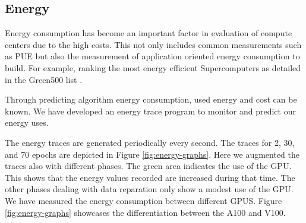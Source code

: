 \documentclass[utf8]{FrontiersinVancouver} %
\begin{document}
\subsection{Energy}
\label{sec:perf-energy}


Energy consumption has become an important factor in evaluation of
compute centers due to the high costs. This not only includes common 
measurements such as PUE but also the measurement of application 
oriented energy consumption to build. For example, ranking the most 
energy efficient Supercomputers as detailed in the Green500 list \citep{green500}.

Through predicting algorithm energy consumption, used energy and cost
can be known. We have developed an energy trace program to monitor 
and predict our energy uses.

The energy traces are generated periodically every second. The traces for
2, 30, and 70 epochs are depicted in Figure \ref{fig:energy-graphs}.
Here we augmented the traces also with different phases. The
green area indicates the use of the GPU. This shows that the energy values
recorded are increased during that time. The other phases dealing with
data reparation only show a modest use of the GPU. We have
measured the energy consumption between different GPUS. Figure
\ref{fig:energy-graphs} showcases the differentiation between the A100
and V100.
\end{document}

